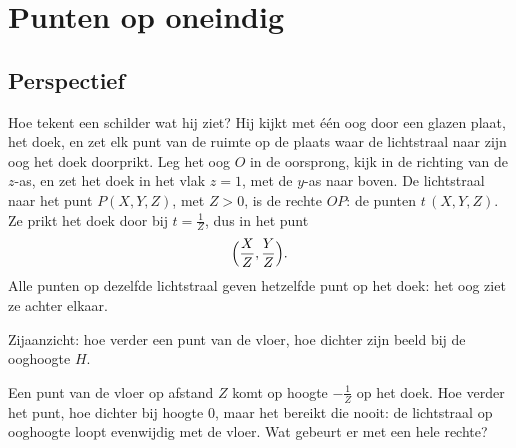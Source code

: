 \begin{oefeningen}[Start]

\end{oefeningen}

\section{Punten op oneindig}

\subsection{Perspectief}

Hoe tekent een schilder wat hij ziet? Hij kijkt met één oog door een glazen plaat, het doek, en zet elk punt van de ruimte op de plaats waar de lichtstraal naar zijn oog het doek doorprikt. Leg het oog $O$ in de oorsprong, kijk in de richting van de $z$-as, en zet het doek in het vlak $z = 1$, met de $y$-as naar boven. De lichtstraal naar het punt $P(X, Y, Z)$, met $Z > 0$, is de rechte $OP$: de punten $t\,(X, Y, Z)$. Ze prikt het doek door bij $t = \tfrac1Z$, dus in het punt
\[ \Bigl(\frac XZ, \frac YZ\Bigr) . \]
Alle punten op dezelfde lichtstraal geven hetzelfde punt op het doek: het oog ziet ze achter elkaar.

\begin{center}\small Zijaanzicht: hoe verder een punt van de vloer, hoe dichter zijn beeld bij de ooghoogte $H$.\end{center}

Een punt van de vloer op afstand $Z$ komt op hoogte $-\tfrac1Z$ op het doek. Hoe verder het punt, hoe dichter bij hoogte 0, maar het bereikt die nooit: de lichtstraal op ooghoogte loopt evenwijdig met de vloer. Wat gebeurt er met een hele rechte?

